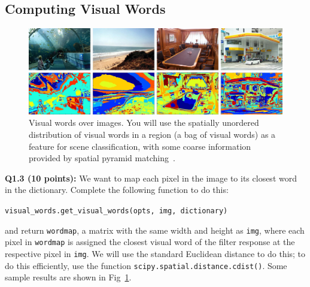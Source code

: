 \documentclass[11pt]{article}
\numberwithin{equation}{section} %
\numberwithin{figure}{section} %
\numberwithin{table}{section} %
\begin{document}
\subsection{Computing Visual Words}

\begin{figure}[h]
  \centering
  \includegraphics[width=\textwidth]{./figures/textons.jpg}
  \caption{Visual words over images. You will use the spatially unordered
    distribution of visual words in a region (a bag of visual words) as a
    feature for scene classification, with some coarse information provided by
    spatial pyramid matching~\cite{1641019}.}
  \label{fig:textons}
\end{figure}

{\bf Q1.3 (10 points):}
We want to map each pixel in the image to its closest word in the dictionary.
Complete the following function to do this:
\begin{center}
{\tt visual\_words.get\_visual\_words(opts, img, dictionary)}
\end{center}
and return {\tt wordmap}, a matrix with the same width and height as {\tt img}, where each pixel in {\tt wordmap} is assigned the closest visual word of the filter response at the respective pixel in {\tt img}. We will use the standard Euclidean distance to do this; to do this efficiently, use the function {\tt scipy.spatial.distance.cdist()}. Some sample results are shown in Fig~\ref{fig:textons}.

\end{document}
